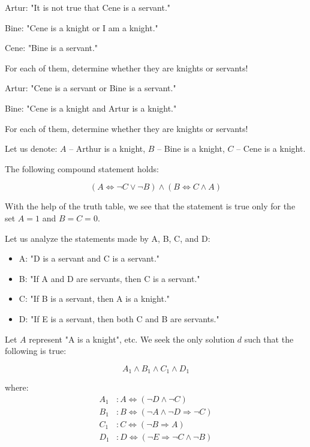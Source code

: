 \documentclass[11pt,paper=b5,footinclude,headinclude]{scrbook} %
\theoremstyle{remark}
\theoremstyle{definition} %
\theoremstyle{theorem} %
\newtheorem{ex}{Exercise\hypertarget{sol:\theex}}[chapter]
\begin{document}
\begin{ex} 
 Artur: "It is not true that Cene is a servant."
 
Bine: "Cene is a knight or I am a knight."

Cene: "Bine is a servant."

For each of them, determine whether they are knights or servants!


\end{ex} \begin{ex} Artur: "Cene is a servant or Bine is a servant."

Bine: "Cene is a knight and Artur is a knight."

For each of them, determine whether they are knights or servants!

\begin{sol}
    
Let us denote: $A$ – Arthur is a knight, $B$ – Bine is a knight, $C$ – Cene is a knight.

The following compound statement holds:

\[
(A \iff \neg C \lor \neg B) \land (B \iff C \land A)
\]

With the help of the truth table, we see that the statement is true only for the set $A = 1$ and $B = C = 0$.
\end{sol}

    \end{ex} \begin{ex} Let us analyze the statements made by A, B, C, and D:

\begin{itemize}
    \item A: "D is a servant and C is a servant."
    \item B: "If A and D are servants, then C is a servant."
    \item C: "If B is a servant, then A is a knight."
    \item D: "If E is a servant, then both C and B are servants."
\end{itemize}

\begin{sol}
Let \( A \) represent "A is a knight", etc. We seek the only solution \( d \) such that the following is true:

\[
A_1 \land B_1 \land C_1 \land D_1
\]

where:
\begin{align*}
A_1 &: A \iff (\neg D \land \neg C)\\
B_1 &: B \iff (\neg A \land \neg D \Rightarrow \neg C)\\
C_1 &: C \iff (\neg B \Rightarrow A)\\
D_1 &: D \iff (\neg E \Rightarrow \neg C \land \neg B)\\
\end{align*}



\end{sol}
\end{ex}
\end{document}
